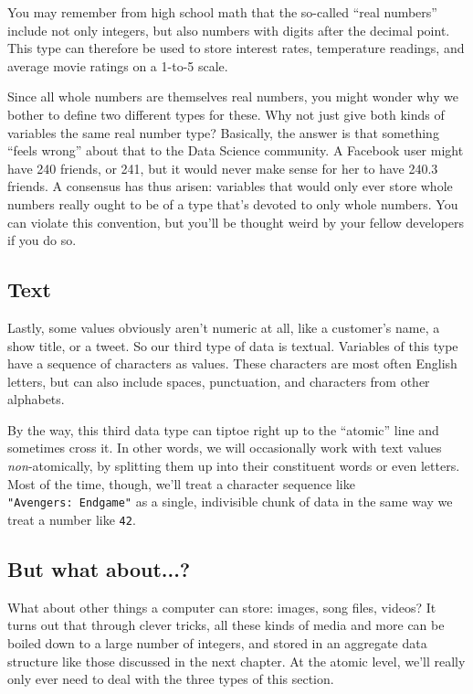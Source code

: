 You may remember from high school math that the so-called ``real numbers''
include not only integers, but also numbers with digits after the decimal
point. This type can therefore be used to store interest rates, temperature
readings, and average movie ratings on a 1-to-5 scale.

Since all whole numbers are themselves real numbers, you might wonder why we
bother to define two different types for these. Why not just give both kinds of
variables the same real number type? Basically, the answer is that something
``feels wrong'' about that to the Data Science community. A Facebook user might
have 240 friends, or 241, but it would never make sense for her to have 240.3
friends. A consensus has thus arisen: variables that would only ever store
whole numbers really ought to be of a type that's devoted to only whole
numbers. You can violate this convention, but you'll be thought weird by your
fellow developers if you do so.


\subsection{Text}

Lastly, some values obviously aren't numeric at all, like a customer's name, a
show title, or a tweet. So our third type of data is textual. Variables of this
type have a sequence of characters as values. These characters are most often
English letters, but can also include spaces, punctuation, and characters from
other alphabets.

By the way, this third data type can tiptoe right up to the ``atomic'' line and
sometimes cross it. In other words, we will occasionally work with text values
\textit{non}-atomically, by splitting them up into their constituent words or
even letters. Most of the time, though, we'll treat a character sequence like
\texttt{"Avengers:\ Endgame"} as a single, indivisible chunk of data in the
same way we treat a number like \texttt{42}.

\subsection{But what about...?}

What about other things a computer can store: images, song files, videos? It
turns out that through clever tricks, all these kinds of media and more can be
boiled down to a large number of integers, and stored in an aggregate data
structure like those discussed in the next chapter. At the atomic level, we'll
really only ever need to deal with the three types of this section.

